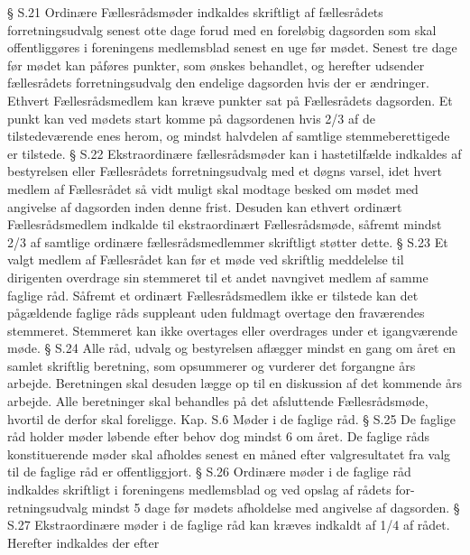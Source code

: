 § S.21 Ordinære Fællesrådsmøder indkaldes skriftligt af fællesrådets forretningsudvalg senest otte dage forud med
             en foreløbig dagsorden som skal offentliggøres i foreningens medlemsblad senest en uge før mødet. Senest
                tre dage før mødet kan påføres punkter, som ønskes behandlet, og herefter udsender fællesrådets
                      forretningsudvalg den endelige dagsorden hvis der er ændringer. Ethvert Fællesrådsmedlem kan kræve
                         punkter sat på Fællesrådets dagsorden.
                           Et punkt kan ved mødets start komme på dagsordenen hvis 2/3 af de tilstedeværende enes herom, og mindst
                             halvdelen af samtlige stemmeberettigede er tilstede.
§ S.22 Ekstraordinære fællesrådsmøder kan i hastetilfælde indkaldes af bestyrelsen eller Fællesrådets
              forretningsudvalg med et døgns varsel, idet hvert medlem af Fællesrådet så vidt muligt skal modtage besked
                 om mødet med angivelse af dagsorden inden denne frist.
                 Desuden kan ethvert ordinært Fællesrådsmedlem indkalde til ekstraordinært Fællesrådsmøde, såfremt mindst
                        2/3 af samtlige ordinære fællesrådsmedlemmer skriftligt støtter dette.
§ S.23 Et valgt medlem af Fællesrådet kan før et møde ved skriftlig meddelelse til dirigenten overdrage sin
           stemmeret til et andet navngivet medlem af samme faglige råd. Såfremt et ordinært Fællesrådsmedlem ikke
               er tilstede kan det pågældende faglige råds suppleant uden fuldmagt overtage den fraværendes stemmeret.
                  Stemmeret kan ikke overtages eller overdrages under et igangværende møde.
§ S.24 Alle råd, udvalg og bestyrelsen aflægger mindst en gang om året en samlet skriftlig beretning, som
          opsummerer og vurderer det forgangne års arbejde. Beretningen skal desuden lægge op til en diskussion af
           det kommende års arbejde. Alle beretninger skal behandles på det afsluttende Fællesrådsmøde, hvortil de
               derfor skal foreligge.
Kap. S.6 Møder i de faglige råd.
§ S.25 De faglige råd holder møder løbende efter behov dog mindst 6 om året.
           De faglige råds konstituerende møder skal afholdes senest en måned efter valgresultatet fra valg til de faglige
             råd er offentliggjort.
§ S.26 Ordinære møder i de faglige råd indkaldes skriftligt i foreningens medlemsblad og ved opslag af rådets for-
           retningsudvalg mindst 5 dage før mødets afholdelse med angivelse af dagsorden.
§ S.27 Ekstraordinære møder i de faglige råd kan kræves indkaldt af 1/4 af rådet. Herefter indkaldes der efter
